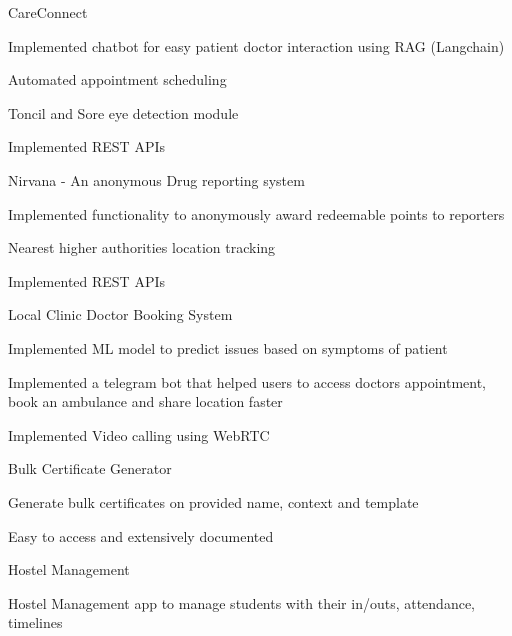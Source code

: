 \vspace{5mm}

\begin{cventries}
  \cvproject
    {CareConnect}
    {
      \begin{cvitems}
        \item {Implemented chatbot for easy patient doctor interaction using RAG (Langchain)}
        \item {Automated appointment scheduling}
        \item {Toncil and Sore eye detection module}
        \item {Implemented REST APIs}
      \end{cvitems}
    }

  \cvproject
    {Nirvana - An anonymous Drug reporting system}
    {
      \begin{cvitems}
        \item {Implemented functionality to anonymously award redeemable points to reporters}
        \item {Nearest higher authorities location tracking}
        \item {Implemented REST APIs}
      \end{cvitems}
    }

  \cvproject
    {Local Clinic Doctor Booking System}
    {
      \begin{cvitems}
        \item {Implemented ML model to predict issues based on symptoms of patient}
        \item {Implemented a telegram bot that helped users to access doctors appointment, book an ambulance and share location faster}
        \item {Implemented Video calling using WebRTC}
      \end{cvitems}
    }

  \cvproject
    {Bulk Certificate Generator}
    {
      \begin{cvitems}
        \item {Generate bulk certificates on provided name, context and template}
        \item {Easy to access and extensively documented}
      \end{cvitems}
    }

  \cvproject
    {Hostel Management}
    {
      \begin{cvitems}
        \item {Hostel Management app to manage students with their in/outs, attendance, timelines}
      \end{cvitems}
    }
\end{cventries}